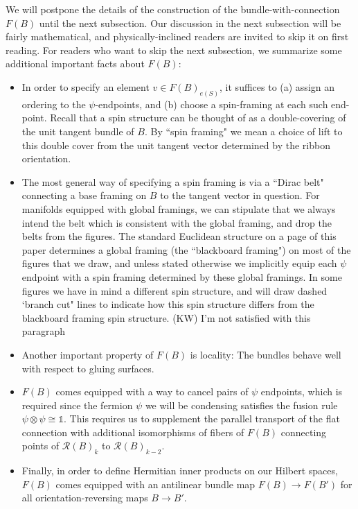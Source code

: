 \documentclass[12pt,a4paper]{article}
\newcommand{\tp}{\otimes}
\newcommand{\unit}{\mathds{1}}
\newcommand{\mcr}{\mathcal{R}}
\newcommand{\kw}[1]{{\color{kwcolor}\footnotesize{(KW) #1}}}
\begin{document}
\medskip

We will postpone the details of the construction of the bundle-with-connection $F(B)$ until the next subsection.
Our discussion in the next subsection will be fairly mathematical, and physically-inclined readers are invited to skip it on first reading. 
For readers who want to skip the next subsection, we summarize some additional important facts about $F(B)$:
\begin{itemize}
\item In order to specify an element $v\in F(B)_{e(S)}$, it suffices to (a) assign an ordering to the $\psi$-endpoints,
and (b) choose a spin-framing at each such end-point.
Recall that a spin structure can be thought of as a double-covering of the unit tangent bundle of $B$.
By ``spin framing" we mean a choice of lift to this double cover from the unit tangent vector determined by the ribbon orientation.
\item The most general way of specifying a spin framing is via a ``Dirac belt" connecting a base framing 
on $B$ to the tangent vector in question.
For manifolds equipped with global framings, we can stipulate that we always intend the belt which is consistent
with the global framing, and drop the belts from the figures.
The standard Euclidean structure on a page of this paper determines a global framing (the ``blackboard framing")
on most of the figures that we draw,
and unless stated otherwise we implicitly equip each 
$\psi$ endpoint with a spin framing determined by these global framings.
In some figures we have in mind a different spin structure,
and will draw dashed `branch cut" lines to indicate how this spin structure differs 
from the blackboard framing spin structure.
\kw{I'm not satisfied with this paragraph}
\item Another important property of $F(B)$ is locality: The bundles behave well with respect to gluing surfaces.
\item $F(B)$ comes equipped with a way to cancel pairs of $\psi$ endpoints, which is required since the fermion $\psi$ we will be condensing satisfies the fusion rule $\psi \tp \psi \cong \unit$.
This requires us to supplement the parallel transport of the flat connection with additional isomorphisms of
fibers of $F(B)$ connecting points of $\mcr(B)_k$ to $\mcr(B)_{k-2}$.
\item Finally, in order to define Hermitian inner products on our Hilbert spaces, $F(B)$ comes equipped with 
an antilinear bundle map $F(B) \to F(B')$ for all orientation-reversing maps $B \to B'$.
\end{itemize}
\end{document}
